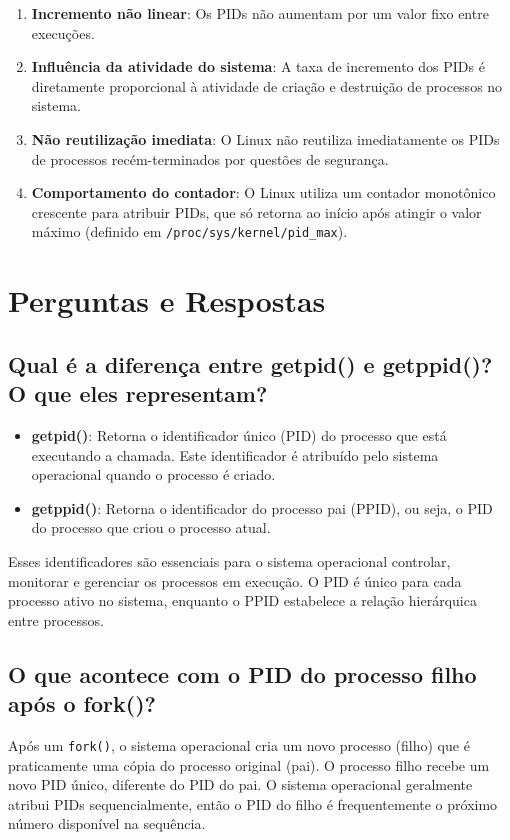 \documentclass[a4paper,11pt]{article}
\begin{document}
\begin{enumerate}
    \item \textbf{Incremento não linear}: Os PIDs não aumentam por um valor fixo entre execuções.
    \item \textbf{Influência da atividade do sistema}: A taxa de incremento dos PIDs é diretamente proporcional à atividade de criação e destruição de processos no sistema.
    \item \textbf{Não reutilização imediata}: O Linux não reutiliza imediatamente os PIDs de processos recém-terminados por questões de segurança.
    \item \textbf{Comportamento do contador}: O Linux utiliza um contador monotônico crescente para atribuir PIDs, que só retorna ao início após atingir o valor máximo (definido em \texttt{/proc/sys/kernel/pid\_max}).
\end{enumerate}

\section{Perguntas e Respostas}

\subsection{Qual é a diferença entre getpid() e getppid()? O que eles representam?}

\begin{itemize}
    \item \textbf{getpid()}: Retorna o identificador único (PID) do processo que está executando a chamada. Este identificador é atribuído pelo sistema operacional quando o processo é criado.
    \item \textbf{getppid()}: Retorna o identificador do processo pai (PPID), ou seja, o PID do processo que criou o processo atual.
\end{itemize}

Esses identificadores são essenciais para o sistema operacional controlar, monitorar e gerenciar os processos em execução. O PID é único para cada processo ativo no sistema, enquanto o PPID estabelece a relação hierárquica entre processos.

\subsection{O que acontece com o PID do processo filho após o fork()?}

Após um \texttt{fork()}, o sistema operacional cria um novo processo (filho) que é praticamente uma cópia do processo original (pai). O processo filho recebe um novo PID único, diferente do PID do pai. O sistema operacional geralmente atribui PIDs sequencialmente, então o PID do filho é frequentemente o próximo número disponível na sequência.
\end{document}

